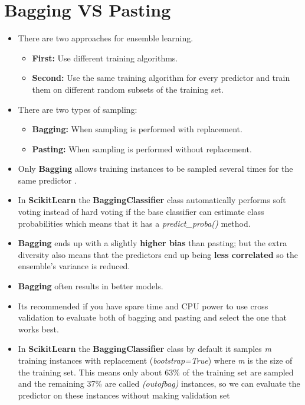 \documentclass{article}
\begin{document}
    \section{Bagging VS Pasting} 
    \begin{itemize}
	    \item There are two approaches for ensemble learning.
    	\begin{itemize}
    		\item \textbf{First:} Use different training algorithms.
    		\item \textbf{Second:} Use the same training algorithm for every predictor and train them on different random subsets of the training set.
    	\end{itemize}
	    \item There are two types of sampling:
	    \begin{itemize}
			\item \textbf{Bagging:} When sampling is performed with replacement.
	   		\item \textbf{Pasting:} When sampling is performed without replacement. 
	    \end{itemize}
    	\item Only \textbf{Bagging} allows training instances to be sampled several times for the same predictor .
    	\item In \textbf{Scikit\textendash Learn} the \textbf{BaggingClassifier} class automatically performs soft voting instead of hard voting if the base classifier can estimate class probabilities which means that it has a \textit{predict\_proba()} method.
    	\item \textbf{Bagging} ends up with a slightly \textbf{higher bias} than pasting; but the extra diversity also means that the predictors end up being \textbf{less correlated} so the ensemble's variance is reduced.
    	\item \textbf{Bagging} often results in better models.
    	\item Its recommended if you have spare time and CPU power to use cross validation to evaluate both of bagging and pasting and select the one that works best.
    	\item In \textbf{Scikit\textendash Learn} the \textbf{BaggingClassifier} class by default it samples \textit{m} training instances with replacement (\textit{bootstrap=True}) where \textit{m} is the size of the training set. This means only about 63\% of the training set are sampled and the remaining 37\% are called \textit{(out\textendash of\textendash bag)} instances, so we can evaluate the predictor on these instances without making validation set
    	

\end{itemize}
\end{document}

